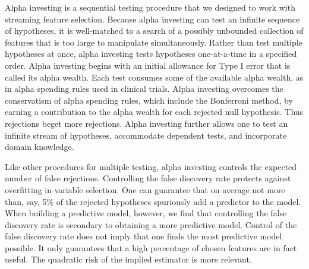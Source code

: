 \documentclass[12pt]{article}
\begin{document}
 Alpha investing \citep{fosterstine08} is a sequential testing procedure that we
 designed to work with streaming feature selection.  Because alpha investing can
 test an infinite sequence of hypotheses, it is well-matched to a search of a
 possibly unbounded collection of features that is too large to manipulate
 simultaneously.  Rather than test multiple hypotheses at once, alpha investing
 tests hypotheses one-at-a-time in a specified order.  Alpha investing begins
 with an initial allowance for Type I error that is called its alpha wealth.
  Each test consumes some of the available alpha wealth, as in alpha spending
 rules used in clinical trials.  Alpha investing overcomes the conservatism of
 alpha spending rules, which include the Bonferroni method, by earning a
 contribution to the alpha wealth for each rejected null hypothesis.  Thus
 rejections beget more rejections.  Alpha investing further allows one to test
 an infinite stream of hypotheses, accommodate dependent tests, and incorporate
 domain knowledge.
 

 Like other procedures for multiple testing, alpha investing controls the
 expected number of false rejections.  Controlling the false discovery rate
 protects against overfitting in variable selection.  One can guarantee that on
 average not more than, say, 5\% of the rejected hypotheses spuriously add a
 predictor to the model.  When building a predictive model, however, we find
 that controlling the false discovery rate is secondary to obtaining a more
 predictive model.  Control of the false discovery rate does not imply that one
 finds the most predictive model possible.  It only guarantees that a high
 percentage of chosen features are in fact useful.  The quadratic risk of the
 implied estimator is more relevant.
\end{document}
